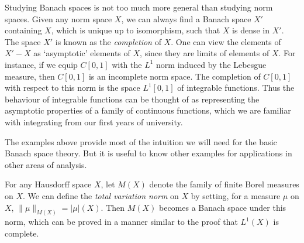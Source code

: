 \begin{remark}
    Studying Banach spaces is not too much more general than studying norm spaces. Given any norm space $X$, we can always find a Banach space $X'$ containing $X$, which is unique up to isomorphism, such that $X$ is dense in $X'$. The space $X'$ is known as the {\it completion} of $X$. One can view the elements of $X' - X$ as `asymptotic' elements of $X$, since they are limits of elements of $X$. For instance, if we equip $C[0,1]$ with the $L^1$ norm induced by the Lebesgue measure, then $C[0,1]$ is an incomplete norm space. The completion of $C[0,1]$ with respect to this norm is the space $L^1[0,1]$ of integrable functions. Thus the behaviour of integrable functions can be thought of as representing the asymptotic properties of a family of continuous functions, which we are familiar with integrating from our first years of university.
\end{remark}

The examples above provide most of the intuition we will need for the basic Banach space theory. But it is useful to know other examples for applications in other areas of analysis.

\begin{example}
    For any Hausdorff space $X$, let $M(X)$ denote the family of finite Borel measures on $X$. We can define the \emph{total variation norm} on $X$ by setting, for a measure $\mu$ on $X$, $\| \mu \|_{M(X)} = |\mu|(X)$. Then $M(X)$ becomes a Banach space under this norm, which can be proved in a manner similar to the proof that $L^1(X)$ is complete.
\end{example}

